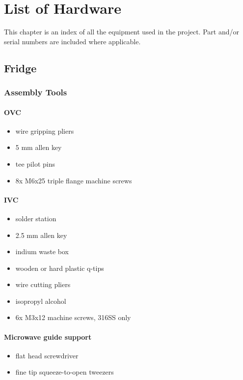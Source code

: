 \chapter{List of Hardware}
\label{hardware}
This chapter is an index of all the equipment used in the project.  Part and/or serial numbers are included where applicable.
 
\section{Fridge}
\subsection{Assembly Tools}
\subsubsection{OVC}

\begin{itemize}
  \item wire gripping pliers
  \item 5 mm allen key
  \item tee pilot pins  
  \item 8x M6x25 triple flange machine screws
\end{itemize}

\subsubsection{IVC}
\begin{itemize}
  \item solder station
  \item 2.5 mm allen key
  \item indium waste box
  \item wooden or hard plastic q-tips
  \item wire cutting pliers
  \item isopropyl alcohol 
  \item 6x M3x12 machine screws, 316SS only
\end{itemize}

\subsubsection{Microwave guide support}

\begin{itemize}
  \item flat head screwdriver
  \item fine tip squeeze-to-open tweezers 
\end{itemize}
 
